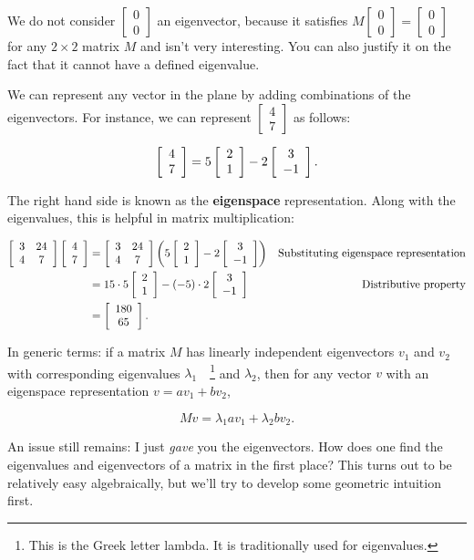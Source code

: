 \documentclass[../gatm.tex]{subfiles}
\begin{document}
We do not consider $\left[\begin{smallmatrix} 0 \\ 0 \end{smallmatrix}\right]$ an eigenvector, because it satisfies $M\left[\begin{smallmatrix} 0 \\ 0 \end{smallmatrix}\right]=\left[\begin{smallmatrix} 0 \\ 0 \end{smallmatrix}\right]$ for any $2\times 2$ matrix $M$ and isn't very interesting. You can also justify it on the fact that it cannot have a defined eigenvalue.

We can represent any vector in the plane by adding combinations of the eigenvectors. For instance, we can represent $\left[\begin{smallmatrix} 4 \\ 7 \end{smallmatrix}\right]$ as follows:

$$\left[\begin{array}{c} 4 \\ 7 \end{array}\right] = 5\left[\begin{array}{c} 2 \\ 1 \end{array}\right] - 2\left[\begin{array}{c} 3 \\ -1 \end{array}\right].$$

\noindent The right hand side is known as the \textbf{eigenspace} representation. Along with the eigenvalues, this is helpful in matrix multiplication:

\begin{align*}
\left[\begin{array}{cc} 3 & 24 \\ 4 & 7 \end{array}\right]\left[\begin{array}{c} 4 \\ 7 \end{array}\right]&=\left[\begin{array}{cc} 3 & 24 \\ 4 & 7 \end{array}\right]\left(5\left[\begin{array}{c} 2 \\ 1 \end{array}\right]-2\left[\begin{array}{c} 3 \\ -1 \end{array}\right]\right) & \text{Substituting eigenspace representation} \\
&= 15\cdot 5 \left[\begin{array}{c} 2 \\ 1 \end{array}\right] - (-5)\cdot 2 \left[\begin{array}{c} 3 \\ -1 \end{array}\right] & \text{Distributive property} \\
&= \left[\begin{array}{c} 180 \\ 65 \end{array}\right]. \\
\end{align*}

\noindent In generic terms: if a matrix $M$ has linearly independent eigenvectors $v_1$ and $v_2$ with corresponding eigenvalues $\lambda_1\quad$\footnote{This is the Greek letter lambda. It is traditionally used for eigenvalues.} and $\lambda_2$, then for any vector $v$ with an eigenspace representation $v=av_1+bv_2$,

$$Mv=\lambda_1av_1 + \lambda_2bv_2.$$

\noindent An issue still remains: I just \textit{gave} you the eigenvectors. How does one find the eigenvalues and eigenvectors of a matrix in the first place? This turns out to be relatively easy algebraically, but we'll try to develop some geometric intuition first.
\end{document}
